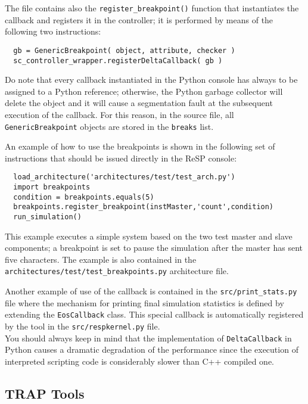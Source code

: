 \indent The file contains also the \texttt{register\_breakpoint()} function that instantiates the callback and registers it in the controller; it is performed by means of the following two instructions:

\scriptsize
\begin{verbatim}
  gb = GenericBreakpoint( object, attribute, checker )
  sc_controller_wrapper.registerDeltaCallback( gb )
\end{verbatim}
\normalsize

\indent Do note that every callback instantiated in the Python console has always to be assigned to a Python reference; otherwise, the Python garbage collector will delete the object and it will cause a segmentation fault at the subsequent execution of the callback. For this reason, in the source file, all \texttt{GenericBreakpoint} objects are stored in the \texttt{breaks} list. 

\indent An example of how to use the breakpoints is shown in the following set of instructions that should be issued directly in the ReSP console:

\scriptsize
\begin{verbatim}
  load_architecture('architectures/test/test_arch.py')
  import breakpoints
  condition = breakpoints.equals(5)
  breakpoints.register_breakpoint(instMaster,'count',condition)
  run_simulation()
\end{verbatim}
\normalsize

This example executes a simple system based on the two test master and slave components; a breakpoint is set to pause the simulation after the master has sent five characters.
The example is also contained in the \texttt{architectures/test/test\_breakpoints.py} architecture file.

\indent Another example of use of the callback is contained in the \texttt{src/print\_stats.py} file where the mechanism for printing final simulation statistics is defined by extending the \texttt{EosCallback} class. This special callback is automatically registered by the tool in the \texttt{src/respkernel.py} file.\\
\indent You should always keep in mind that the implementation of \texttt{DeltaCallback} in Python causes a dramatic degradation of the performance since the execution of interpreted scripting code is considerably slower than C++ compiled one.

\subsection{TRAP Tools}
\label{general:advanced:tools}
